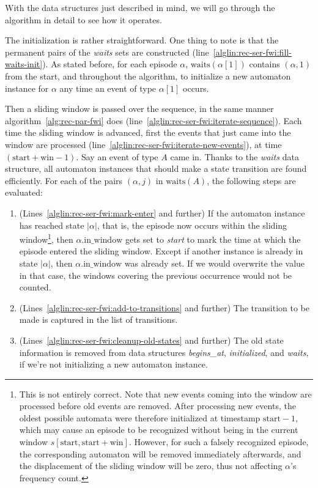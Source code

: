 With the data structures just described in mind, we will go through the algorithm in detail to see how it operates.

The initialization is rather straightforward. One thing to note is that the permanent pairs of the \emph{waits} sets are constructed (line~\ref{alglin:rec-ser-fwi:fill-waits-init}). As stated before, for each episode $ \alpha $, $ \text{waits}(\alpha[1]) $ contains $ (\alpha, 1) $ from the start, and throughout the algorithm, to initialize a new automaton instance for $ \alpha $ any time an event of type $ \alpha[1] $ occurs.

Then a sliding window is passed over the sequence, in the same manner algorithm~\ref{alg:rec-par-fwi} does (line~\ref{alglin:rec-ser-fwi:iterate-sequence}). Each time the sliding window is advanced, first the events that just came into the window are processed (line~\ref{alglin:rec-ser-fwi:iterate-new-events}), at time $ (\text{start} + \text{win} - 1) $. Say an event of type $ A $ came in. Thanks to the \emph{waits} data structure, all automaton instances that should make a state transition are found efficiently. For each of the pairs $ (\alpha, j) $ in $ \text{waits}(A) $, the following steps are evaluated:

\begin{enumerate}
\item (Lines~\ref{alglin:rec-ser-fwi:mark-enter} and further) If the automaton instance has reached state $ | \alpha | $, that is, the episode now occurs within the sliding window\footnote{This is not entirely correct. Note that new events coming into the window are processed before old events are removed. After processing new events, the oldest possible automata were therefore initialized at timestamp $ \text{start} - 1 $, which may cause an episode to be recognized without being in the current window $ s[\text{start}, \text{start} + \text{win}] $. However, for such a falsely recognized episode, the corresponding automaton will be removed immediately afterwards, and the displacement of the sliding window will be zero, thus not affecting $ \alpha $'s frequency count.}, then $ \alpha \text{.in\_window} $ gets set to \emph{start} to mark the time at which the episode entered the sliding window. Except if another instance is already in state $ | \alpha | $, then $ \alpha \text{.in\_window} $ was already set. If we would overwrite the value in that case, the windows covering the previous occurrence would not be counted.
\item (Lines~\ref{alglin:rec-ser-fwi:add-to-transitions} and further) The transition to be made is captured in the list of transitions.
\item (Lines~\ref{alglin:rec-ser-fwi:cleanup-old-states} and further) The old state information is removed from data structures \emph{begins\_at}, \emph{initialized}, and \emph{waits}, if we're not initializing a new automaton instance.
\end{enumerate}

